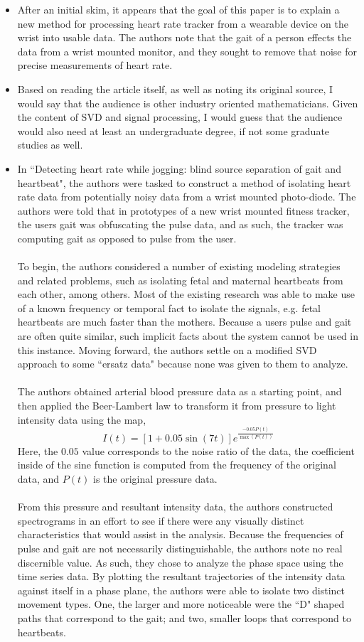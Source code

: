 \documentclass[letterpaper,10pt]{article}
\begin{document}
\begin{itemize}
\item After an initial skim, it appears that the goal of this paper is to explain a new method for processing heart rate tracker from a wearable device on the wrist into usable data. The authors note that the gait of a person effects the data from a wrist mounted monitor, and they sought to remove that noise for precise measurements of heart rate.
\item Based on reading the article itself, as well as noting its original source, I would say that the audience is other industry oriented mathematicians. Given the content of SVD and signal processing, I would guess that the audience would also need at least an undergraduate degree, if not some graduate studies as well. 
\item In ``Detecting heart rate while jogging: blind source separation of gait and heartbeat", the authors were tasked to construct a method of isolating heart rate data from potentially noisy data from a wrist mounted photo-diode. The authors were told that in prototypes of a new wrist mounted fitness tracker, the users gait was obfuscating the pulse data, and as such, the tracker was computing gait as opposed to pulse from the user.\\\\
To begin, the authors considered a number of existing modeling strategies and related problems, such as isolating fetal and maternal heartbeats from each other, among others. Most of the existing research was able to make use of a known frequency or temporal fact to isolate the signals, e.g. fetal heartbeats are much faster than the mothers. Because a users pulse and gait are often quite similar, such implicit facts about the system cannot be used in this instance. Moving forward, the authors settle on a modified SVD approach to some ``ersatz data" because none was given to them to analyze.\\\\
The authors obtained arterial blood pressure data as a starting point, and then applied the Beer-Lambert law to transform it from pressure to light intensity data using the map,
\[I(t)=[1+0.05\sin(7t)]e^{\frac{-0.05P(t)}{\max(P(t))}}\]
Here, the $0.05$ value corresponds to the noise ratio of the data, the coefficient inside of the sine function is computed from the frequency of the original data, and $P(t)$ is the original pressure data.\\\\
From this pressure and resultant intensity data, the authors constructed spectrograms in an effort to see if there were any visually distinct characteristics that would assist in the analysis. Because the frequencies of pulse and gait are not necessarily distinguishable, the authors note no real discernible value. As such, they chose to analyze the phase space using the time series data. By plotting the resultant trajectories of the intensity data against itself in a phase plane, the authors were able to isolate two distinct movement types. One, the larger and more noticeable were the ``D" shaped paths that correspond to the gait; and two, smaller loops that correspond to heartbeats.\\\\

\end{itemize}
\end{document}
